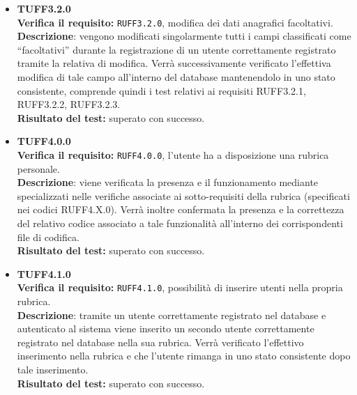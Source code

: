 \begin{itemize}

\item \textbf{TUFF3.2.0}\\
\textbf{Verifica il requisito:} \texttt{RUFF3.2.0}, modifica dei dati anagrafici facoltativi.\\
\textbf{Descrizione}: vengono modificati singolarmente tutti i campi classificati come ``facoltativi'' durante la registrazione di un utente  correttamente registrato tramite la relativa  di modifica. Verrà successivamente verificato l'effettiva modifica di tale campo all'interno del database mantenendolo in uno stato consistente, comprende quindi i test relativi ai requisiti RUFF3.2.1, RUFF3.2.2, RUFF3.2.3.\\
\textbf{Risultato del test:} superato con successo.

\item \textbf{TUFF4.0.0}\\
\textbf{Verifica il requisito:} \texttt{RUFF4.0.0}, l'utente ha a disposizione una rubrica personale.\\
\textbf{Descrizione}: viene verificata la presenza e il funzionamento mediante  specializzati nelle verifiche associate ai sotto-requisiti della rubrica (specificati nei codici RUFF4.X.0). Verrà inoltre confermata la presenza e la correttezza del relativo codice associato a tale funzionalità all'interno dei corrispondenti file di codifica.\\
\textbf{Risultato del test:} superato con successo.

\item \textbf{TUFF4.1.0}\\
\textbf{Verifica il requisito:} \texttt{RUFF4.1.0}, possibilità di inserire utenti nella propria rubrica.\\
\textbf{Descrizione}: tramite un utente  correttamente registrato nel database e autenticato al sistema viene inserito un secondo utente  correttamente registrato nel database nella sua rubrica. Verrà verificato l'effettivo inserimento nella rubrica e che l'utente rimanga in uno stato consistente dopo tale inserimento.\\
\textbf{Risultato del test:} superato con successo.


\end{itemize}

